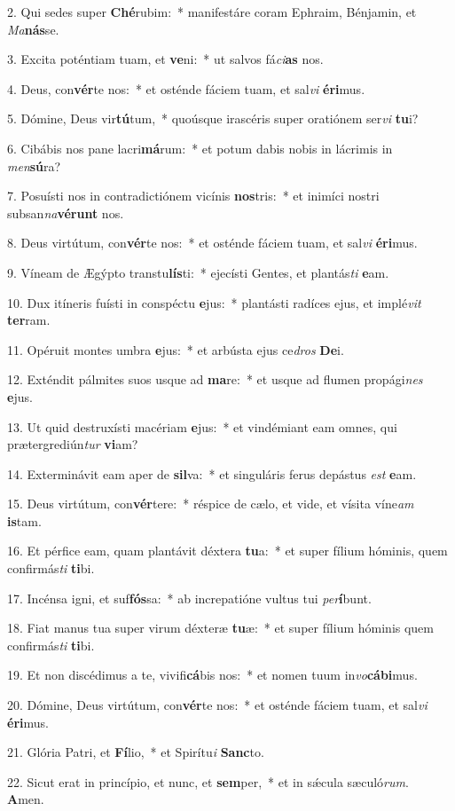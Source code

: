 2. Qui sedes super \textbf{Ché}rubim:~*  manifestáre coram Ephraim, Bénjamin, et \textit{Ma}\textbf{nás}se.\

3. Excita poténtiam tuam, et \textbf{ve}ni:~*  ut salvos fá\textit{ci}\textbf{as} nos.\

4. Deus, con\textbf{vér}te nos:~*  et osténde fáciem tuam, et sal\textit{vi} \textbf{é}\textbf{ri}mus.\

5. Dómine, Deus vir\textbf{tú}tum,~*  quoúsque irascéris super oratiónem ser\textit{vi} \textbf{tu}i?\

6. Cibábis nos pane lacri\textbf{má}rum:~*  et potum dabis nobis in lácrimis in \textit{men}\textbf{sú}ra?\

7. Posuísti nos in contradictiónem vicínis \textbf{nos}tris:~*  et inimíci nostri subsan\textit{na}\textbf{vé}\textbf{runt} nos.\

8. Deus virtútum, con\textbf{vér}te nos:~*  et osténde fáciem tuam, et sal\textit{vi} \textbf{é}\textbf{ri}mus.\

9. Víneam de Ægýpto transtu\textbf{lís}ti:~*  ejecísti Gentes, et plantás\textit{ti} \textbf{e}am.\

10. Dux itíneris fuísti in conspéctu \textbf{e}jus:~*  plantásti radíces ejus, et implé\textit{vit} \textbf{ter}ram.\

11. Opéruit montes umbra \textbf{e}jus:~*  et arbústa ejus ce\textit{dros} \textbf{De}i.\

12. Exténdit pálmites suos usque ad \textbf{ma}re:~*  et usque ad flumen propági\textit{nes} \textbf{e}jus.\

13. Ut quid destruxísti macériam \textbf{e}jus:~*  et vindémiant eam omnes, qui prætergrediún\textit{tur} \textbf{vi}am?\

14. Exterminávit eam aper de \textbf{sil}va:~*  et singuláris ferus depástus \textit{est} \textbf{e}am.\

15. Deus virtútum, con\textbf{vér}tere:~*  réspice de cælo, et vide, et vísita víne\textit{am} \textbf{is}tam.\

16. Et pérfice eam, quam plantávit déxtera \textbf{tu}a:~*  et super fílium hóminis, quem confirmás\textit{ti} \textbf{ti}bi.\

17. Incénsa igni, et suf\textbf{fós}sa:~*  ab increpatióne vultus tui \textit{per}\textbf{í}bunt.\

18. Fiat manus tua super virum déxteræ \textbf{tu}æ:~*  et super fílium hóminis quem confirmás\textit{ti} \textbf{ti}bi.\

19. Et non discédimus a te, vivifi\textbf{cá}bis nos:~*  et nomen tuum in\textit{vo}\textbf{cá}\textbf{bi}mus.\

20. Dómine, Deus virtútum, con\textbf{vér}te nos:~*  et osténde fáciem tuam, et sal\textit{vi} \textbf{é}\textbf{ri}mus.\

21. Glória Patri, et \textbf{Fí}lio,~*  et Spirítu\textit{i} \textbf{Sanc}to.\

22. Sicut erat in princípio, et nunc, et \textbf{sem}per,~*  et in sǽcula sæculó\textit{rum}. \textbf{A}men.\

